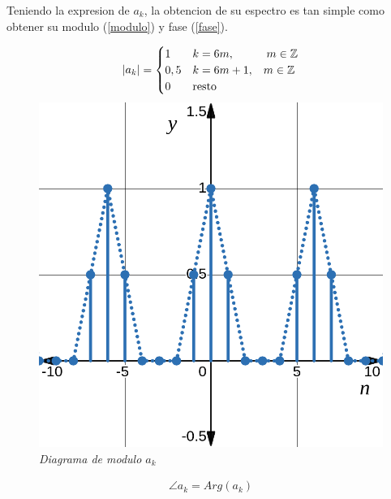 \documentclass[a4paper,12pt]{report}
\begin{document}
\begin{enumerate}[label=\alph*), left=0pt]
    Teniendo la expresion de $a_k$, la obtencion de su espectro es tan simple como obtener su modulo (\ref{modulo}) y
    fase (\ref{fase}).\\

    \begin{figure}[H]
      \centering
      \noindent
      \begin{minipage}{0.4\textwidth}
        \centering
        \begin{align*}
          |a_k| =
          \begin{cases}
            1 &k = 6m, \hspace{1cm} m \in \mathbb{Z}\\
            0,5 &k = 6m+1, \hspace{3mm} m \in \mathbb{Z}\\
            0 &\text{resto}
          \end{cases}
        \end{align*}
        \includegraphics[width=1\textwidth]{./images/ej5.3.png}
        \textit{Diagrama de modulo $a_k$}
      \end{minipage}
      \hspace{1cm}
      \begin{minipage}{0.4\textwidth}
        \centering
        \begin{align*}
          \angle a_k = Arg(a_k)\\[12pt]

\end{align*}
\end{minipage}
\end{figure}
\end{enumerate}
\end{document}
